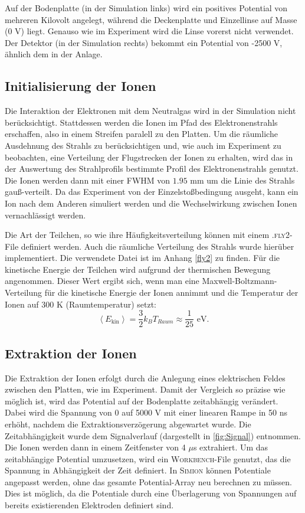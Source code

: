 Auf der Bodenplatte (in der Simulation links) wird ein positives Potential von mehreren Kilovolt angelegt, während die Deckenplatte und Einzellinse auf Masse (0 V) liegt. Genauso wie im Experiment wird die Linse vorerst nicht verwendet. Der Detektor (in der Simulation rechts) bekommt ein Potential von -2500 V, ähnlich dem in der Anlage. 

\subsection{Initialisierung der Ionen}
Die Interaktion der Elektronen mit dem Neutralgas wird in der Simulation nicht berücksichtigt. Stattdessen werden die Ionen im Pfad des Elektronenstrahls erschaffen, also in einem Streifen paralell zu den Platten. Um die räumliche Ausdehnung des Strahls zu berücksichtigen und, wie auch im Experiment zu beobachten, eine Verteilung der Flugstrecken der Ionen zu erhalten, wird das in der Auswertung des Strahlprofils bestimmte Profil des Elektronenstrahls genutzt. Die Ionen werden dann mit einer FWHM von $1.95$ mm um die Linie des Strahls gauß-verteilt. Da das Experiment von der Einzelstoßbedingung ausgeht, kann ein Ion nach dem Anderen simuliert werden und die Wechselwirkung zwischen Ionen vernachlässigt werden.

Die Art der Teilchen, so wie ihre Häufigkeitsverteilung können mit einem \textsc{.fly2}-File definiert werden. Auch die räumliche Verteilung des Strahls wurde hierüber implementiert. Die verwendete Datei ist im Anhang \ref{fly2} zu finden. Für die kinetische Energie der Teilchen wird aufgrund der thermischen Bewegung angenommen. Dieser Wert ergibt sich, wenn man eine Maxwell-Boltzmann-Verteilung für die kinetische 
Energie der Ionen annimmt und die Temperatur der Ionen auf 300 K (Raumtemperatur) setzt: 
\begin{equation}
    \label{eq:kin}
    \left< E_{\text{kin}} \right> = \frac{3}{2} k_B T_{Raum} \approx \frac{1}{25} \text{ eV}.
\end{equation}

\subsection{Extraktion der Ionen}
Die Extraktion der Ionen erfolgt durch die Anlegung eines elektrischen Feldes zwischen den Platten, wie im Experiment. Damit der Vergleich so präzise wie möglich ist, wird das Potential auf der Bodenplatte zeitabhängig verändert. Dabei wird die Spannung von 0 auf 5000 V mit einer linearen Rampe in 50 ns erhöht, nachdem die Extraktionsverzögerung abgewartet wurde. Die Zeitabhängigkeit wurde dem Signalverlauf (dargestellt in \ref{fig:Signal}) entnommen. Die Ionen werden dann in einem Zeitfenster von 4 $\mu$s extrahiert. Um das zeitabhängige Potential umzusetzen, wird ein \textsc{Workbench}-File genutzt, das die Spannung in Abhängigkeit der Zeit definiert. In \textsc{Simion} können Potentiale angepasst werden, ohne das gesamte Potential-Array neu berechnen zu müssen. Dies ist möglich, da die Potentiale durch eine Überlagerung von Spannungen auf bereits existierenden Elektroden definiert sind.

